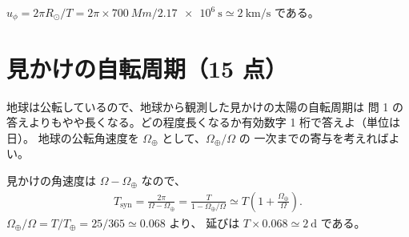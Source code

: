 \documentclass[a4j,12pt]{ltjarticle}
\newif\ifshowanswer
\numberwithin{equation}{section}
\newcommand{\ansspace}[1]{\ifshowanswer\vspace{2mm}\else\vspace{#1}\fi}
\newcommand{\haiten}[1]{\texorpdfstring{\hfill\normalsize（#1 点）}{}}  %
\begin{document}
\begin{kaitou}
  $u_\phi = 2\pi R_\odot / T
   = 2\pi \times \qty{700}{Mm} / \qty{2.17e6}{\second}
   \simeq \qty{2}{\km\per\second}$ である。
\end{kaitou}


\section{見かけの自転周期\haiten{15}}

地球は公転しているので、地球から観測した見かけの太陽の自転周期は
問 1 の答えよりもやや長くなる。どの程度長くなるか有効数字 1 桁で答えよ（単位は日）。
地球の公転角速度を $\Omega_\oplus$ として、$\Omega_\oplus/\Omega$ の
一次までの寄与を考えればよい。

\ansspace{5cm}

\begin{kaitou}
  見かけの角速度は $\Omega - \Omega_\oplus$ なので、
  \begin{align*}
    T_\mathrm{syn} = \frac{2\pi}{\Omega-\Omega_\oplus}
      = \frac{T}{1-\Omega_\oplus/\Omega}
      \simeq T\left(1+\frac{\Omega_\oplus}{\Omega}\right).
  \end{align*}
  $\Omega_\oplus/\Omega = T/T_\oplus = 25/365 \simeq 0.068$ より、
  延びは $T \times 0.068 \simeq \qty{2}{\day}$ である。
\end{kaitou}
\end{document}
